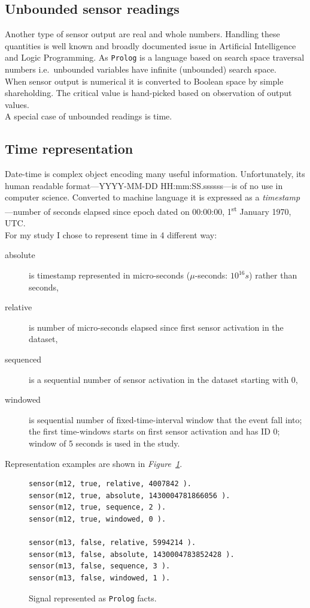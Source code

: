 \documentclass[12pt, a4paper, pdflatex, leqno, twoside, openright]{report}
\newcommand{\ts}{\textsuperscript}
\begin{document}
    \subsection{Unbounded sensor readings}
Another type of sensor output are real and whole numbers. Handling these quantities is well known and broadly documented issue in Artificial Intelligence and Logic Programming. As \texttt{Prolog} is a language based on search space traversal numbers i.e.\ unbounded variables have infinite (unbounded) search space.\\

When sensor output is numerical it is converted to Boolean space by simple shareholding. The critical value is hand-picked based on observation of output values.\\
A special case of unbounded readings is time.

    \subsection{Time representation\label{sec:timeRepresentation}}
Date-time is complex object encoding many useful information. Unfortunately, its human readable format---YYYY-MM-DD HH:mm:SS.ssssss---is of no use in computer science. Converted to machine language it is expressed as a \emph{timestamp}---number of seconds elapsed since epoch dated on 00:00:00, 1\ts{st} January 1970, UTC.\\

For my study I chose to represent time in 4 different way:
\begin{description}
\item[absolute] is timestamp represented in micro-seconds ($\mu$-seconds: $10^{16}s$) rather than seconds,
\item[relative] is number of micro-seconds elapsed since first sensor activation in the dataset,
\item[sequenced] is a sequential number of sensor activation in the dataset starting with $0$,
\item[windowed] is sequential number of fixed-time-interval window that the event fall into; the first time-windows starts on first sensor activation and has ID $0$; window of 5 seconds is used in the study.
\end{description}
Representation examples are shown in \emph{Figure~\ref{lst:timerepresentation}}.\\

\begin{figure}[htb] %
  \begin{verbatim}
sensor(m12, true, relative, 4007842 ).
sensor(m12, true, absolute, 1430004781866056 ).
sensor(m12, true, sequence, 2 ).
sensor(m12, true, windowed, 0 ).

sensor(m13, false, relative, 5994214 ).
sensor(m13, false, absolute, 1430004783852428 ).
sensor(m13, false, sequence, 3 ).
sensor(m13, false, windowed, 1 ).
  \end{verbatim}
  \caption{Signal represented as \texttt{Prolog} facts.\label{lst:timerepresentation}}
\end{figure}
\end{document}
